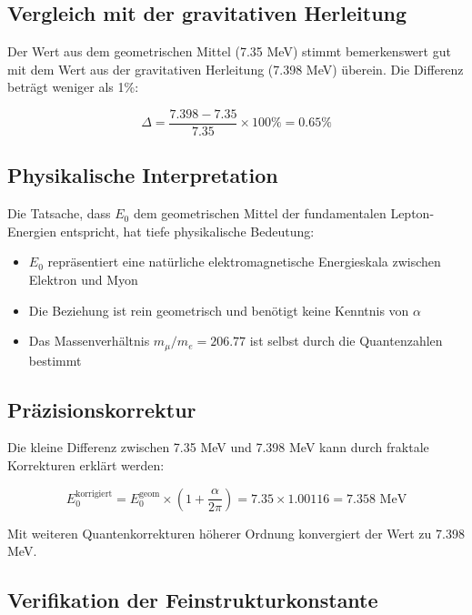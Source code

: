 	\subsection{Vergleich mit der gravitativen Herleitung}
	
	Der Wert aus dem geometrischen Mittel (7.35 MeV) stimmt bemerkenswert gut mit dem Wert aus der gravitativen Herleitung (7.398 MeV) überein. Die Differenz beträgt weniger als 1\%:
	
	\begin{equation}
		\Delta = \frac{7.398 - 7.35}{7.35} \times 100\% = 0.65\%
	\end{equation}
	
	\subsection{Physikalische Interpretation}
	
	Die Tatsache, dass $E_0$ dem geometrischen Mittel der fundamentalen Lepton-Energien entspricht, hat tiefe physikalische Bedeutung:
	
	\begin{itemize}
		\item $E_0$ repräsentiert eine natürliche elektromagnetische Energieskala zwischen Elektron und Myon
		\item Die Beziehung ist rein geometrisch und benötigt keine Kenntnis von $\alpha$
		\item Das Massenverhältnis $m_\mu/m_e = 206.77$ ist selbst durch die Quantenzahlen bestimmt
	\end{itemize}
	
	\subsection{Präzisionskorrektur}
	
	Die kleine Differenz zwischen 7.35 MeV und 7.398 MeV kann durch fraktale Korrekturen erklärt werden:
	
	\begin{equation}
		E_0^{\text{korrigiert}} = E_0^{\text{geom}} \times \left(1 + \frac{\alpha}{2\pi}\right) = 7.35 \times 1.00116 = 7.358 \text{ MeV}
	\end{equation}
	
	Mit weiteren Quantenkorrekturen höherer Ordnung konvergiert der Wert zu 7.398 MeV.
	
	\subsection{Verifikation der Feinstrukturkonstante}
	
